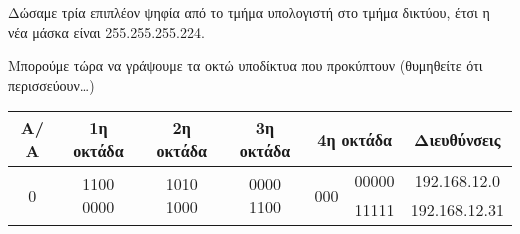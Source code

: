 Δώσαμε τρία επιπλέον ψηφία από το τμήμα υπολογιστή στο τμήμα δικτύου, έτσι η νέα μάσκα είναι 255.255.255.224.

Μπορούμε τώρα να γράψουμε τα οκτώ υποδίκτυα που προκύπτουν (θυμηθείτε ότι περισσεύουν\ldots)

\begin{center}
\fontsize{10}{12}
\ttfamily
\begin{tabular}{|c|c|c|c|c|c|c|}
\hline
                \textbf{Α/Α}  & \textbf{1η οκτάδα}  & \textbf{2η οκτάδα}  & \textbf{3η οκτάδα}  & \multicolumn{2}{c|}{\textbf{4η οκτάδα }}  & \textbf{Διευθύνσεις} \\ \hline

\multirow{2}{*}{0} &\multirow{2}{*}{1100 0000} & \multirow{2}{*}{1010 1000} & \multirow{2}{*}{0000 1100} & \multirow{2}{*}{000}  & 00000 & 192.168.12.0 \\  \cline{6-7} 
                  & &  &  &                    & 11111 & 192.168.12.31  \\ \hline


\end{tabular}
\end{center}

